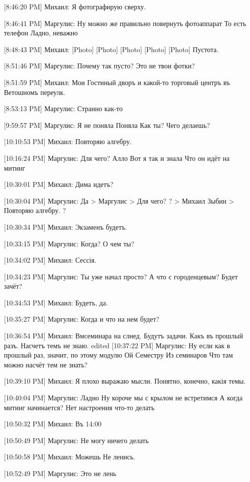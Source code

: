 \documentclass{article}
\newcommand{\yat}{{\fontencoding{X2}\selectfont\cyryat}} %
\begin{document}
[8:46:20 PM] Михаил:
Я фотографирую сверху.

[8:46:41 PM] Маргулис:
Ну можно же правильно повернуть фотоаппарат
 То есть телефон
 Ладно, неважно

[8:48:43 PM] Михаил:
[Photo]
 [Photo]
 [Photo]
 [Photo]
 [Photo]
 Пустота.

[8:51:46 PM] Маргулис:
Почему так пусто? Это не твои фотки?

[8:51:59 PM] Михаил:
Мои
 Гостиный дворъ и какой-то торговый центръ въ Ветошномъ переулк\yat.

[8:53:13 PM] Маргулис:
Странно как-то

[9:59:57 PM] Маргулис:
Я не поняла
 Поняла
 Как ты? Чего делаешь?

[10:10:53 PM] Михаил:
Повторяю алгебру.

[10:16:24 PM] Маргулис:
Для чего?
 Алло
 Вот я так и знала
 Что он идёт на митинг

[10:30:01 PM] Михаил:
Дима идетъ?

[10:30:04 PM] Маргулис:
Да
> Маргулис
> Для чего?
?
> Михаил Зыбин
> Повторяю алгебру.
?

[10:30:34 PM] Михаил:
Экзаменъ будетъ.

[10:33:15 PM] Маргулис:
Когда?
 О чем ты?

[10:34:02 PM] Михаил:
Сессія.

[10:34:23 PM] Маргулис:
Ты уже начал просто?
 А что с городенцевым?
 Будет зачёт?

[10:34:53 PM] Михаил:
Будетъ, да.

[10:35:27 PM] Маргулис:
Когда и что на нем будет?

[10:36:54 PM] Михаил:
Вм семинара на сл нед\yatл\yat. Будутъ задачи. Какъ въ прошлый разъ. Насчетъ темъ не знаю.
edited 
[10:37:22 PM] Маргулис:
Ну если как в прошлый раз, значит, по этому модулю
 Ой
 Семестру
 Из семинаров
 Что там можно насчёт тем не знать?

[10:39:10 PM] Михаил:
Я плохо выражаю мысли.
 Понятно, конечно, какія темы.

[10:40:04 PM] Маргулис:
Ладно
 Ну короче мы с крылом не встретимся
 А когда митинг начинается?
 Нет настроения что-то делать

[10:50:32 PM] Михаил:
Въ 14:00

[10:50:49 PM] Маргулис:
Не могу ничего делать

[10:50:58 PM] Михаил:
Можешь
 Не ленись.

[10:52:49 PM] Маргулис:
Это не лень
\end{document}
